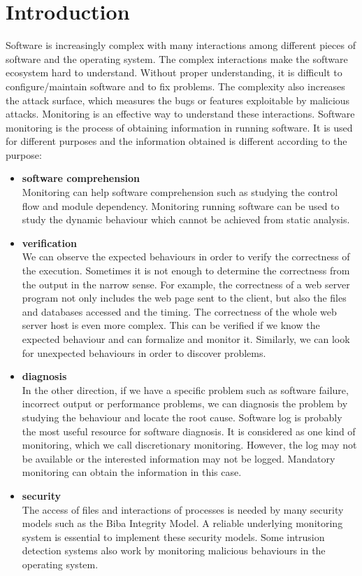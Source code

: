 \chapter{Introduction}

Software is increasingly complex with many interactions among
different pieces of software and the operating system.
The complex interactions make the software ecosystem hard to understand.
Without proper understanding,
it is difficult to configure/maintain software and to fix problems.
The complexity also increases the attack surface, which measures the
bugs or features exploitable by malicious attacks.
Monitoring is an effective way to understand these interactions.
Software monitoring is the process of obtaining information
in running software.
It is used for different purposes and the information obtained is different
according to the purpose:

\begin{itemize}
\item {\bf software comprehension} \\
Monitoring can help software comprehension such as studying the control
flow and module dependency.
Monitoring running software can be used to study the dynamic behaviour which
cannot be achieved from static analysis.
\item {\bf verification} \\
We can observe the expected behaviours in order to
verify the correctness of the execution.
Sometimes it is not enough to determine the correctness from the output in
the narrow sense.
For example, the correctness of a web server program not only includes
the web page sent to the client,
but also the files and databases accessed and the timing.
The correctness of the whole web server host is even more complex.
This can be verified if we know the expected behaviour and
can formalize and monitor it.
Similarly, we can look for unexpected behaviours in order to discover problems.
\item {\bf diagnosis} \\
In the other direction, if we have a specific problem such as software failure,
incorrect output or performance problems, we can diagnosis the problem by
studying the behaviour and locate the root cause.
Software log is probably the most useful resource for software diagnosis.
It is considered as one kind of monitoring,
which we call discretionary monitoring.
However, the log may not be available or the interested information
may not be logged.
Mandatory monitoring can obtain the information in this case.
\item {\bf security} \\
The access of files and interactions of processes is needed by many
security models such as the Biba Integrity Model.
A reliable underlying monitoring system is essential to implement
these security models.
Some intrusion detection systems also work by monitoring malicious
behaviours in the operating system.
\end{itemize}

